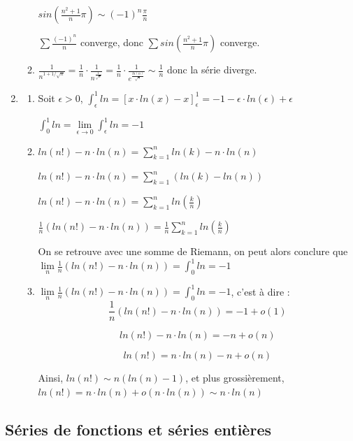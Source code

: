 \documentclass[]{article}
\begin{document}
\begin{enumerate}
\begin{enumerate}
	$sin\left(\frac{n^2+1}{n}\pi\right) \sim (-1)^n \frac{\pi}{n}$
	
	$\sum \frac{(-1)^n}{n}$ converge, donc $\sum sin\left(\frac{n^2+1}{n}\pi\right)$ converge.
	
	\item
	$\frac{1}{n^{1+1/\sqrt{n}}} = \frac{1}{
	n} \cdot \frac{1}{n^\frac{1}{\sqrt{n}}} = \frac{1}{
		n} \cdot \frac{1}{e^{\frac{ln(n)}{\sqrt{n}}}} \sim \frac{1}{n}$ donc la série diverge.
\end{enumerate}

\item
\begin{enumerate}
	\item Soit $\epsilon > 0$, $\displaystyle \int_{\epsilon}^{1}ln = [x\cdot ln(x)-x]_\epsilon^1=-1-\epsilon\cdot ln(\epsilon)+\epsilon$
	
	$\displaystyle \int_0^1 ln = \lim\limits_{\epsilon \to 0} \int_{\epsilon}^{1} ln = -1$
	
	\item $ln(n!) - n \cdot ln(n) = \displaystyle \sum_{k=1}^{n} ln(k) - n \cdot ln(n)$
	
	$ln(n!) - n \cdot ln(n) = \displaystyle \sum_{k=1}^{n} (ln(k) - ln(n))$
	
	$ln(n!) - n \cdot ln(n) = \displaystyle \sum_{k=1}^{n} ln \left(\frac{k}{n}\right)$
	
	$\frac{1}{n} (ln(n!) - n \cdot ln(n)) = \frac{1}{n}\displaystyle \sum_{k=1}^{n} ln \left(\frac{k}{n}\right)$
	
	On se retrouve avec une somme de Riemann, on peut alors conclure que $\displaystyle \lim\limits_{n} \frac{1}{n} (ln(n!) - n \cdot ln(n)) = \int_0^1 ln = -1$
	
	\item $\displaystyle \lim\limits_{n} \frac{1}{n} (ln(n!) - n \cdot ln(n)) = \int_0^1 ln = -1$, c'est à dire :
	$$\frac{1}{n} (ln(n!) - n \cdot ln(n)) = -1 + o(1)$$
	
	$$ln(n!) - n \cdot ln(n) = -n + o(n)$$
	
	$$ln(n!) = n \cdot ln(n) - n + o(n)$$
	
	Ainsi, $ln(n!) \sim n(ln(n)-1)$, et plus grossièrement, $ln(n!) = n \cdot ln(n) + o(n \cdot ln(n)) \sim n \cdot ln(n)$
\end{enumerate}

\end{enumerate}

\subsection{Séries de fonctions et séries entières}
\end{document}
